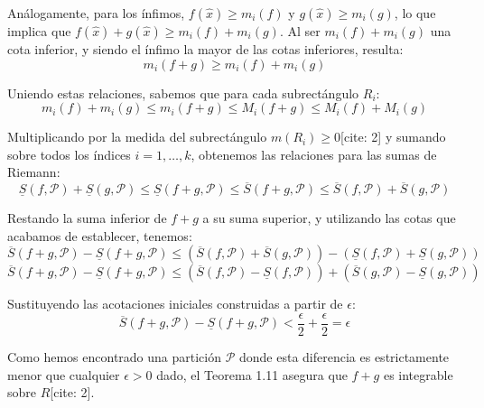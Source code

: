 \documentclass[11pt,letterpaper]{article}
\begin{document}
Análogamente, para los ínfimos, $f(\hat{x}) \ge m_{i}(f)$ y $g(\hat{x}) \ge m_{i}(g)$, lo que implica que $f(\hat{x}) + g(\hat{x}) \ge m_{i}(f) + m_{i}(g)$. Al ser $m_{i}(f) + m_{i}(g)$ una cota inferior, y siendo el ínfimo la mayor de las cotas inferiores, resulta:
\begin{equation*}
m_{i}(f+g) \ge m_{i}(f) + m_{i}(g)
\end{equation*}

Uniendo estas relaciones, sabemos que para cada subrectángulo $R_{i}$:
\begin{equation*}
m_{i}(f) + m_{i}(g) \le m_{i}(f+g) \le M_{i}(f+g) \le M_{i}(f) + M_{i}(g)
\end{equation*}

Multiplicando por la medida del subrectángulo $m(R_{i}) \ge 0$[cite: 2] y sumando sobre todos los índices $i=1, \dots, k$, obtenemos las relaciones para las sumas de Riemann:
\begin{equation*}
\underline{S}(f,\mathcal{P}) + \underline{S}(g,\mathcal{P}) \le \underline{S}(f+g,\mathcal{P}) \le \overline{S}(f+g,\mathcal{P}) \le \overline{S}(f,\mathcal{P}) + \overline{S}(g,\mathcal{P})
\end{equation*}

Restando la suma inferior de $f+g$ a su suma superior, y utilizando las cotas que acabamos de establecer, tenemos:
\begin{equation*}
\overline{S}(f+g,\mathcal{P}) - \underline{S}(f+g,\mathcal{P}) \le (\overline{S}(f,\mathcal{P}) + \overline{S}(g,\mathcal{P})) - (\underline{S}(f,\mathcal{P}) + \underline{S}(g,\mathcal{P}))
\end{equation*}
\begin{equation*}
\overline{S}(f+g,\mathcal{P}) - \underline{S}(f+g,\mathcal{P}) \le (\overline{S}(f,\mathcal{P}) - \underline{S}(f,\mathcal{P})) + (\overline{S}(g,\mathcal{P}) - \underline{S}(g,\mathcal{P}))
\end{equation*}

Sustituyendo las acotaciones iniciales construidas a partir de $\epsilon$:
\begin{equation*}
\overline{S}(f+g,\mathcal{P}) - \underline{S}(f+g,\mathcal{P}) < \frac{\epsilon}{2} + \frac{\epsilon}{2} = \epsilon
\end{equation*}

Como hemos encontrado una partición $\mathcal{P}$ donde esta diferencia es estrictamente menor que cualquier $\epsilon > 0$ dado, el Teorema 1.11 asegura que $f+g$ es integrable sobre $R$[cite: 2].
\end{document}
